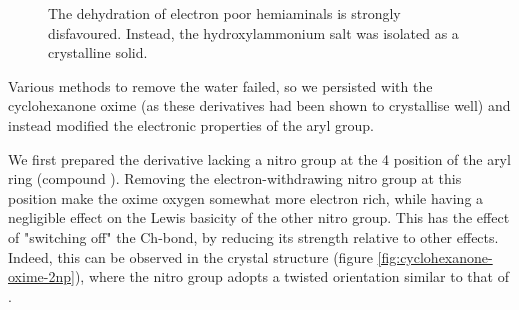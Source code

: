 \begin{refsection}
\begin{figure}
\centering
{}
\caption[Dehydration of electron poor hemiaminals]{The dehydration of electron poor hemiaminals is strongly disfavoured. Instead, the hydroxylammonium salt was isolated as a crystalline solid.}
\label{sch:hexafluoroacetone}
\end{figure}

Various methods to remove the water failed, so we persisted with the cyclohexanone oxime (as these derivatives had been shown to crystallise well) and instead modified the electronic properties of the aryl group.

We first prepared the derivative lacking a nitro group at the 4 position of the aryl ring (compound ).
Removing the electron-withdrawing nitro group at this position make the oxime oxygen somewhat more electron rich, while having a negligible effect on the Lewis basicity of the other nitro group.
This has the effect of "switching off" the Ch-bond, by reducing its strength relative to other effects.
Indeed, this can be observed in the crystal structure (figure \ref{fig:cyclohexanone-oxime-2np}), where the nitro group adopts a twisted orientation similar to that of .


\end{refsection}
